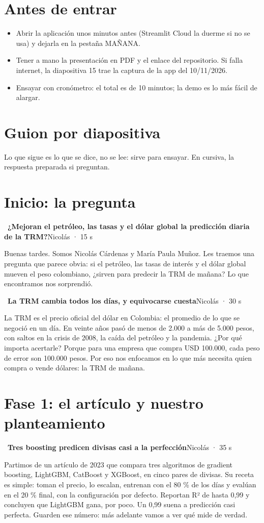 \documentclass[11pt,letterpaper]{article}
\newcommand{\diapo}[4]{\par\bigskip{\color{oro}\textbf{#1.}}~\textbf{#2}\hfill{\small #3 · #4}\par\nopagebreak\smallskip}
\begin{document}
\section*{Antes de entrar}
\begin{itemize}
\item Abrir la aplicación unos minutos antes (Streamlit Cloud la duerme si no se usa) y dejarla en la pestaña MAÑANA.
\item Tener a mano la presentación en PDF y el enlace del repositorio. Si falla internet, la diapositiva 15 trae la captura de la app del 10/11/2026.
\item Ensayar con cronómetro: el total es de 10 minutos; la demo es lo más fácil de alargar.
\end{itemize}

\newpage
\section*{Guion por diapositiva}
Lo que sigue es lo que se dice, no se lee: sirve para ensayar. En cursiva, la respuesta preparada si preguntan.
\section*{Inicio: la pregunta}
\diapo{1}{¿Mejoran el petróleo, las tasas y el dólar global la predicción diaria de la TRM?}{Nicolás}{15 s}
Buenas tardes. Somos Nicolás Cárdenas y María Paula Muñoz. Les traemos una pregunta que parece obvia: si el petróleo, las tasas de interés y el dólar global mueven el peso colombiano, ¿sirven para predecir la TRM de mañana? Lo que encontramos nos sorprendió.

\diapo{2}{La TRM cambia todos los días, y equivocarse cuesta}{Nicolás}{30 s}
La TRM es el precio oficial del dólar en Colombia: el promedio de lo que se negoció en un día. En veinte años pasó de menos de 2.000 a más de 5.000 pesos, con saltos en la crisis de 2008, la caída del petróleo y la pandemia. ¿Por qué importa acertarle? Porque para una empresa que compra USD 100.000, cada peso de error son 100.000 pesos. Por eso nos enfocamos en lo que más necesita quien compra o vende dólares: la TRM de mañana.

\section*{Fase 1: el artículo y nuestro planteamiento}
\diapo{3}{Tres boosting predicen divisas casi a la perfección}{Nicolás}{35 s}
Partimos de un artículo de 2023 que compara tres algoritmos de gradient boosting, LightGBM, CatBoost y XGBoost, en cinco pares de divisas. Su receta es simple: toman el precio, lo escalan, entrenan con el 80 \% de los días y evalúan en el 20 \% final, con la configuración por defecto. Reportan R² de hasta 0,99 y concluyen que LightGBM gana, por poco. Un 0,99 suena a predicción casi perfecta. Guarden ese número: más adelante vamos a ver qué mide de verdad.
\end{document}
